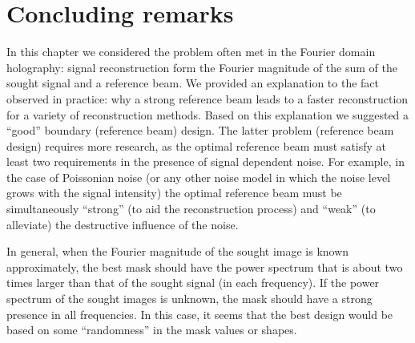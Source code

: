 




\section{Concluding remarks}
\label{sec:boundary-conclusions}

In this chapter we considered the problem often met in the Fourier
domain holography: signal reconstruction form the Fourier magnitude of
the sum of the sought signal and a reference beam. We provided an
explanation to the fact observed in practice: why a strong reference
beam leads to a faster reconstruction for a variety of reconstruction
methods. Based on this explanation we suggested a ``good''  boundary
(reference beam) design. The latter problem (reference beam design)
requires more research, as the optimal reference beam must satisfy at
least two requirements in the presence of signal dependent noise. For
example, in the case of Poissonian noise (or any other noise model in
which the noise level grows with the signal intensity) the optimal
reference beam must be simultaneously ``strong'' (to aid the reconstruction process)
and ``weak'' (to alleviate) the destructive influence of the noise.

In general, when the Fourier magnitude of the sought image is known
approximately, the best mask should have the power spectrum that is
about two times larger than that of the sought signal (in each
frequency). If the power spectrum of the sought images is unknown, the
mask should have a strong presence in all frequencies. In this case,
it seems that the best design would be based on some ``randomness'' in
the mask values or shapes.


